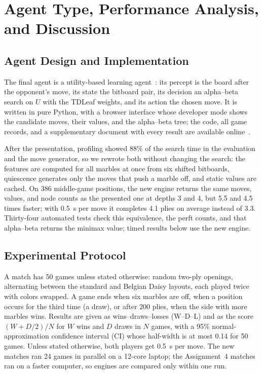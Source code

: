 \documentclass[conference,a4paper]{IEEEtran}
\begin{document}
\section{Agent Type, Performance Analysis, and Discussion}

\subsection{Agent Design and Implementation}
The final agent is a utility-based learning agent~\cite{russell2021}: its percept is the board after the opponent's move, its state the bitboard pair, its decision an alpha--beta search on $U$ with the TDLeaf weights, and its action the chosen move. It is written in pure Python, with a browser interface whose developer mode shows the candidate moves, their values, and the alpha--beta tree; the code, all game records, and a supplementary document with every result are available online~\cite{repo}.

After the presentation, profiling showed 88\% of the search time in the evaluation and the move generator, so we rewrote both without changing the search: the features are computed for all marbles at once from six shifted bitboards, quiescence generates only the moves that push a marble off, and static values are cached. On 386 middle-game positions, the new engine returns the same moves, values, and node counts as the presented one at depths 3 and 4, but 5.5 and 4.5 times faster; with 0.5~s per move it completes 4.1 plies on average instead of 3.3. Thirty-four automated tests check this equivalence, the perft counts, and that alpha--beta returns the minimax value; timed results below use the new engine.

\subsection{Experimental Protocol}
A match has 50 games unless stated otherwise: random two-ply openings, alternating between the standard and Belgian Daisy layouts, each played twice with colors swapped. A game ends when six marbles are off, when a position occurs for the third time (a draw), or after 200 plies, when the side with more marbles wins. Results are given as wins--draws--losses (W--D--L) and as the score $(W+D/2)/N$ for $W$ wins and $D$ draws in $N$ games, with a 95\% normal-approximation confidence interval (CI) whose half-width is at most 0.14 for 50 games. Unless stated otherwise, both players get 0.5~s per move. The new matches ran 24 games in parallel on a 12-core laptop; the Assignment~4 matches ran on a faster computer, so engines are compared only within one run.
\end{document}
